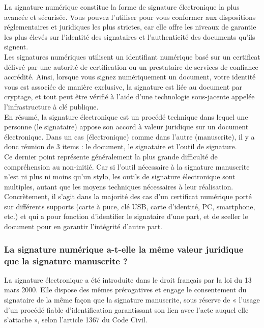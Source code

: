 			    La signature numérique constitue la forme de signature électronique la plus avancée et sécurisée. Vous pouvez l’utiliser pour vous conformer aux dispositions réglementaires et juridiques les plus strictes, car elle offre les niveaux de garantie les plus élevés sur l'identité des signataires et l'authenticité des documents qu'ils signent.\\
			    
                Les signatures numériques utilisent un identifiant numérique basé sur un certificat délivré par une autorité de certification ou un prestataire de services de confiance accrédité. Ainsi, lorsque vous signez numériquement un document, votre identité vous est associée de manière exclusive, la signature est liée au document par cryptage, et tout peut être vérifié à l’aide d’une technologie sous-jacente appelée l'infrastructure à clé publique.\\
                
                 En résumé, la signature électronique est un procédé technique dans lequel une personne (le signataire) appose son accord à valeur juridique sur un document électronique. Dans un cas (électronique) comme dans l’autre (manuscrite), il y a donc réunion de 3 items : le document, le signataire et l’outil de signature\cite{certeurope}.\\
                 
                 Ce dernier point représente généralement la plus grande difficulté de compréhension au non-initié. Car si l’outil nécessaire à la signature manuscrite n’est ni plus ni moins qu’un stylo, les outils de signature électronique sont multiples, autant que les moyens techniques nécessaires à leur réalisation. Concrètement, il s’agit dans la majorité des cas d’un certificat numérique porté sur différents supports (carte à puce, clé USB, carte d’identité, PC, smartphone, etc.) et qui a pour fonction d’identifier le signataire d’une part, et de sceller le document pour en garantir l’intégrité d’autre part.
                 
                
            \subsubsection{La signature numérique a-t-elle la même valeur juridique que la signature manuscrite ?}
            
                La signature électronique a été introduite dans le droit français par la loi du 13 mars 2000\cite{signapp}. Elle dispose des mêmes prérogatives et engage le consentement du signataire de la même façon que la signature manuscrite, sous réserve de « l’usage d’un procédé fiable d’identification garantissant son lien avec l’acte auquel elle s’attache », selon l’article 1367 du Code Civil.\\
                
